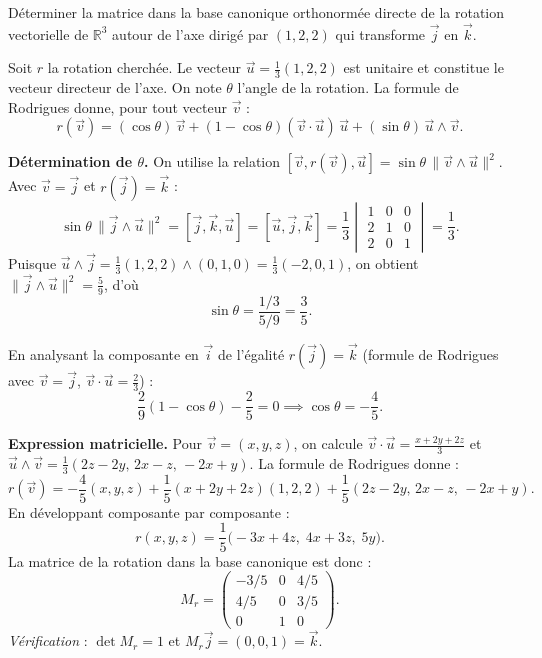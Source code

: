 \documentclass[12pt,a4paper]{article}
\begin{document}
\begin{boiteexercice}
Déterminer la matrice dans la base canonique orthonormée directe de la rotation vectorielle de
$\mathbb{R}^3$ autour de l'axe dirigé par $(1,2,2)$ qui transforme $\vec{j}$ en $\vec{k}$.
\end{boiteexercice}

\begin{boitecorrige}
Soit $r$ la rotation cherchée. Le vecteur $\vec{u} = \tfrac{1}{3}(1,2,2)$ est unitaire et constitue
le vecteur directeur de l'axe. On note $\theta$ l'angle de la rotation. La formule de Rodrigues donne,
pour tout vecteur $\vec{v}$ :
\[
  r(\vec{v}) = (\cos\theta)\,\vec{v} + (1-\cos\theta)(\vec{v}\cdot\vec{u})\,\vec{u}
               + (\sin\theta)\,\vec{u}\wedge\vec{v}.
\]

\textbf{Détermination de $\theta$.}
On utilise la relation $[\vec{v},r(\vec{v}),\vec{u}] = \sin\theta\,\|\vec{v}\wedge\vec{u}\|^2$.
Avec $\vec{v}=\vec{j}$ et $r(\vec{j})=\vec{k}$ :
\[
  \sin\theta\,\|\vec{j}\wedge\vec{u}\|^2 = [\vec{j},\vec{k},\vec{u}] = [\vec{u},\vec{j},\vec{k}]
  = \frac{1}{3}\begin{vmatrix}1&0&0\\2&1&0\\2&0&1\end{vmatrix} = \frac{1}{3}.
\]
Puisque $\vec{u}\wedge\vec{j} = \tfrac{1}{3}(1,2,2)\wedge(0,1,0) = \tfrac{1}{3}(-2,0,1)$,
on obtient $\|\vec{j}\wedge\vec{u}\|^2 = \tfrac{5}{9}$, d'où
\[
  \sin\theta = \frac{1/3}{5/9} = \frac{3}{5}.
\]

En analysant la composante en $\vec{i}$ de l'égalité $r(\vec{j})=\vec{k}$ (formule de Rodrigues
avec $\vec{v}=\vec{j}$, $\vec{v}\cdot\vec{u}=\tfrac{2}{3}$) :
\[
  \frac{2}{9}(1-\cos\theta) - \frac{2}{5} = 0 \implies \cos\theta = -\frac{4}{5}.
\]

\textbf{Expression matricielle.}
Pour $\vec{v}=(x,y,z)$, on calcule $\vec{v}\cdot\vec{u} = \tfrac{x+2y+2z}{3}$ et
$\vec{u}\wedge\vec{v} = \tfrac{1}{3}(2z-2y,\, 2x-z,\, -2x+y)$.
La formule de Rodrigues donne :
\[
  r(\vec{v}) = -\frac{4}{5}(x,y,z) + \frac{1}{5}(x+2y+2z)(1,2,2)
               + \frac{1}{5}(2z-2y,\, 2x-z,\, -2x+y).
\]
En développant composante par composante :
\[
  r(x,y,z) = \frac{1}{5}\bigl(-3x+4z,\; 4x+3z,\; 5y\bigr).
\]
La matrice de la rotation dans la base canonique est donc :
\[
  \boxed{M_r = \begin{pmatrix} -3/5 & 0 & 4/5 \\ 4/5 & 0 & 3/5 \\ 0 & 1 & 0 \end{pmatrix}.}
\]
\textit{Vérification} : $\det M_r = 1$ et $M_r\vec{j} = (0,0,1) = \vec{k}$.
\end{boitecorrige}
\end{document}
